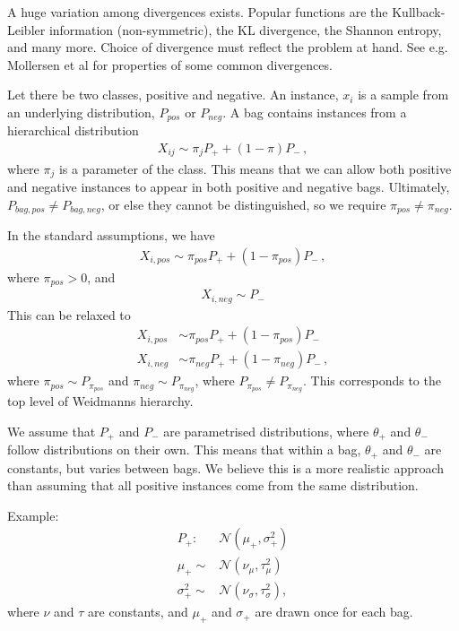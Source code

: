 A huge variation among divergences exists.
Popular functions are the Kullback-Leibler information (non-symmetric), the KL divergence, the Shannon entropy, and many more. 
Choice of divergence must reflect the problem at hand. 
See e.g. {\color{green} Mollersen et al} for properties of some common divergences. 

Let there be two classes, positive and negative. 
An instance, $x_i$ is a sample from an underlying distribution, $P_{pos}$ or $P_{neg}$. 
A bag contains instances from a hierarchical distribution
\begin{align}
  X_{ij} \sim \pi_j P_+ + (1-\pi) P_- \, ,
\end{align}
where $\pi_j$ is a parameter of the class. 
This means that we can allow both positive and negative instances to appear in both positive and negative bags.
Ultimately, $P_{bag, pos} \neq P_{bag, neg}$, or else they cannot be distinguished, so we require $\pi_{pos} \neq \pi_{neg}$.

In the standard assumptions, we have
\begin{align}
  X_{i, {pos}} \sim \pi_{pos}P_+ + (1-\pi_{pos}) P_- \, ,
\end{align}
where $\pi_{pos} > 0$, and
\begin{align}
  X_{i,{neg}} \sim P_-
\end{align}
This can be relaxed to 
\begin{align}
  X_{i,pos} & \sim \pi_{pos}P_+ + (1-\pi_{pos}) P_- \\
  X_{i,neg} & \sim \pi_{neg}P_+ + (1-\pi_{neg}) P_- \, ,
\end{align}
where $\pi_{pos} \sim P_{\pi_{pos}}$ and $\pi_{neg} \sim P_{\pi_{neg}}$, where $P_{\pi_{pos}} \neq P_{\pi_{neg}}$. 
This corresponds to the top level of Weidmanns hierarchy. 

We assume that $P_+$ and $P_-$ are parametrised distributions, where $\theta_+$ and $\theta_-$ follow distributions on their own. 
This means that within a bag, $\theta_+$ and $\theta_-$ are constants, but varies between bags. 
We believe this is a more realistic approach than assuming that all positive instances come from the same distribution. 

Example: \\
\begin{align}
  P_+:  \, &\mathcal{N} (\mu_+, \sigma_+^2) \\
  \mu_+ \sim & \mathcal{N} (\nu_\mu, \tau_\mu^2) \\
  \sigma_+^2  \sim & \mathcal{N} (\nu_\sigma, \tau_\sigma^2),   
\end{align}
where $\nu$ and $\tau$ are constants, and $\mu_+$ and $\sigma_+$ are drawn once for each bag. 


